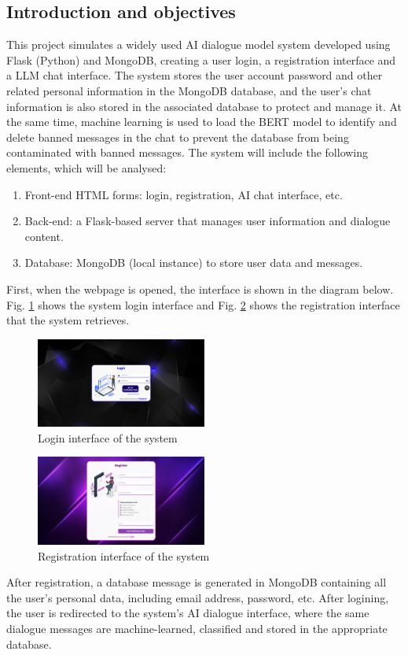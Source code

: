 \documentclass{article}
\begin{document}
\subsection{Introduction and objectives}
This project simulates a widely used AI dialogue model system developed using Flask (Python) and MongoDB, creating a user login, a registration interface and a LLM chat interface. The system stores the user account password and other related personal information in the MongoDB database, and the user's chat information is also stored in the associated database to protect and manage it. 
At the same time, machine learning is used to load the BERT model\cite{Devlin2019BERTPO} to identify and delete banned messages in the chat to prevent the database from being contaminated with banned messages.
The system will include the following elements, which will be analysed:
\begin{enumerate}
    \item Front-end HTML forms: login, registration, AI chat interface, etc.
    \item Back-end: a Flask-based server that manages user information and dialogue content.
    \item Database: MongoDB (local instance) to store user data and messages.
\end{enumerate}

First, when the webpage is opened, the interface is shown in the diagram below. Fig. \ref{fig:login} shows the system login interface and Fig. \ref{fig:registration} shows the registration interface that the system retrieves.
\begin{figure}[htb]
    \centering
    \includegraphics[width=0.5\textwidth]{images/login_screenshot.png}
    \caption{Login interface of the system}
    \label{fig:login}
\end{figure}

\begin{figure}[htb]
    \centering
    \includegraphics[width=0.5\textwidth]{images/registration_screenshot.png}
    \caption{Registration interface of the system}
    \label{fig:registration}
\end{figure}
After registration, a database message is generated in MongoDB containing all the user's personal data, including email address, password, etc. After logining, the user is redirected to the system's AI dialogue interface, where the same dialogue messages are machine-learned, classified and stored in the appropriate database.
\end{document}
